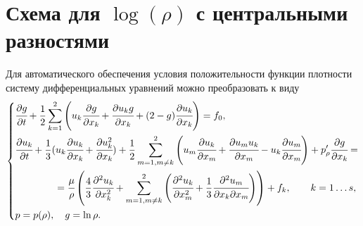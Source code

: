 \section{Схема для $\log(\rho)$ с центральными разностями}
\label{scheme1}

Для автоматического обеспечения условия положительности функции плотности систему дифференциальных уравнений можно преобразовать к виду
\begin{equation}
\left\{
\begin{aligned}
& \cfrac{\partial g}{\partial t} + \frac{1}{2}\sum_{k=1}^{2}\left(u_k\cfrac{\partial g}{\partial x_k}+
  \cfrac{\partial u_k g}{\partial x_k} + (2-g)\cfrac{\partial u_k}{\partial x_k}\right) = f_0,\\
& \cfrac{\partial u_k}{\partial t} + \frac{1}{3}(u_k\cfrac{\partial u_k}{\partial x_k} + 
  \cfrac{\partial u_k^2}{\partial x_k})
  + \frac{1}{2}\sum_{m=1,m\neq k}^{2}\left( u_m\cfrac{\partial u_k}{\partial x_m}+
  \cfrac{\partial u_m u_k}{\partial x_m} - u_k\cfrac{\partial u_m}{\partial x_m}\right)
  + p'_{\rho} \cfrac{\partial g}{\partial x_k} = \\
& \qquad\qquad = \cfrac{\mu}{\rho}\left( \frac{4}{3} \cfrac{\partial^2 u_k}{\partial x_k^2} + 
  \sum_{m=1,m\neq k}^{2}\left( \cfrac{\partial^2 u_k}{\partial x_m^2} + 
  \frac{1}{3} \cfrac{\partial^2 u_m}{\partial x_k \partial x_m} \right)\right) + f_k,\qquad k = 1 \dots s,\\
& p = p(\rho), \quad g = \ln \rho.
\end{aligned}
\right.
\end{equation}

